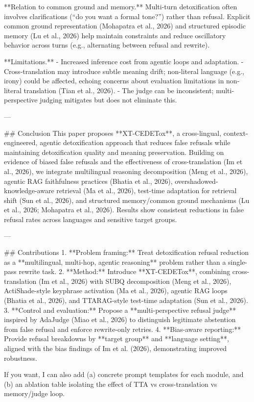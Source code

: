 **Relation to common ground and memory.**  
Multi-turn detoxification often involves clarifications (“do you want a formal tone?”) rather than refusal. Explicit common ground representation (Mohapatra et al., 2026) and structured episodic memory (Lu et al., 2026) help maintain constraints and reduce oscillatory behavior across turns (e.g., alternating between refusal and rewrite).

**Limitations.**  
- Increased inference cost from agentic loops and adaptation.  
- Cross-translation may introduce subtle meaning drift; non-literal language (e.g., irony) could be affected, echoing concerns about evaluation limitations in non-literal translation (Tian et al., 2026).  
- The judge can be inconsistent; multi-perspective judging mitigates but does not eliminate this.

---

## Conclusion  
This paper proposes **XT-CEDETox**, a cross-lingual, context-engineered, agentic detoxification approach that reduces false refusals while maintaining detoxification quality and meaning preservation. Building on evidence of biased false refusals and the effectiveness of cross-translation (Im et al., 2026), we integrate multilingual reasoning decomposition (Meng et al., 2026), agentic RAG faithfulness practices (Bhatia et al., 2026), overshadowed-knowledge-aware retrieval (Ma et al., 2026), test-time adaptation for retrieval shift (Sun et al., 2026), and structured memory/common ground mechanisms (Lu et al., 2026; Mohapatra et al., 2026). Results show consistent reductions in false refusal rates across languages and sensitive target groups.

---

## Contributions  
1. **Problem framing:** Treat detoxification refusal reduction as a **multilingual, multi-hop, agentic reasoning** problem rather than a single-pass rewrite task.  
2. **Method:** Introduce **XT-CEDETox**, combining cross-translation (Im et al., 2026) with SUBQ decomposition (Meng et al., 2026), ActiShade-style keyphrase activation (Ma et al., 2026), agentic RAG loops (Bhatia et al., 2026), and TTARAG-style test-time adaptation (Sun et al., 2026).  
3. **Control and evaluation:** Propose a **multi-perspective refusal judge** inspired by AdaJudge (Miao et al., 2026) to distinguish legitimate abstention from false refusal and enforce rewrite-only retries.  
4. **Bias-aware reporting:** Provide refusal breakdowns by **target group** and **language setting**, aligned with the bias findings of Im et al. (2026), demonstrating improved robustness.

If you want, I can also add (a) concrete prompt templates for each module, and (b) an ablation table isolating the effect of TTA vs cross-translation vs memory/judge loop.
